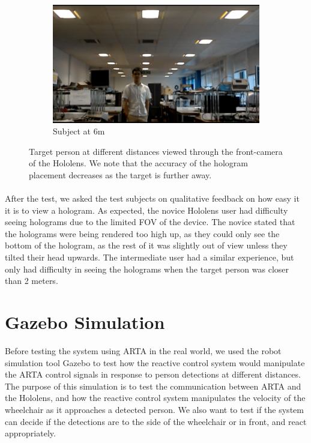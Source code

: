 \begin{figure}[ht]
	\begin{subfigure}[b]{.32\textwidth}
		\centering
		\includegraphics[width=1.0\linewidth]{img/chapter6_test/marek2.png}
		\caption{Subject at 6m}
	\end{subfigure}
	\vspace{-1\baselineskip}
	\begin{center}
		\caption{Target person at different distances viewed through the front-camera of the Hololens. We note that the accuracy of the hologram placement decreases as the target is further away.}
		\label{fig:marek}
	\end{center}
	\vspace{-2\baselineskip}
\end{figure}

\paragraph{} After the test, we asked the test subjects on qualitative feedback on how easy it it is to view a hologram. As expected, the novice Hololens user had difficulty seeing holograms due to the limited FOV of the device. The novice stated that the holograms were being rendered too high up, as they could only see the bottom of the hologram, as the rest of it was slightly out of view unless they tilted their head upwards. The intermediate user had a similar experience, but only had difficulty in seeing the holograms when the target person was closer than 2 meters.

\section{Gazebo Simulation} \label{sec:gazeboSimTest}
Before testing the system using ARTA in the real world, we used the robot simulation tool Gazebo to test how the reactive control system would manipulate the ARTA control signals in response to person detections at different distances. The purpose of this simulation is to test the communication between ARTA and the Hololens, and how the reactive control system manipulates the velocity of the wheelchair as it approaches a detected person. We also want to test if the system can decide if the detections are to the side of the wheelchair or in front, and react appropriately. 


